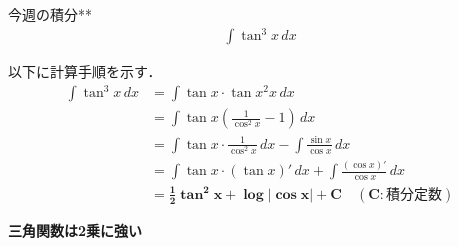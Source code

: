 \documentclass[main]{subfiles}
\begin{document}

\begin{mondai}{1}{今週の積分}{**}
    \begin{align*}
        \int \tan^3 x \, dx
    \end{align*}
\end{mondai}


\solutionhead
\hfill
以下に計算手順を示す．
\hfill\ 
\begin{align*}
    \int \tan ^3 x \, dx   
        &= \int \tan x \cdot \tan x ^2 x \, dx \\
        &= \int \tan x \left( \frac{1}{\cos ^2 x} -1 \right)  \, dx \\
        &= \int \tan x \cdot \frac{1}{\cos ^2 x} \, dx - \int \frac{\sin x}{\cos x} \, dx \\
        &= \int \tan x \cdot \left(\tan x\right)' \, dx + \int \frac{\left(\cos x\right)'}{\cos x} \, dx \\
        &= \boldsymbol{\frac{1}{2} \tan ^2 x + \log \left| \cos x \right| + C \quad (C:\textbf{積分定数})}
\end{align*}

\begin{focusbox}
\centering
\textbf{三角関数は2乗に強い}
\end{focusbox}
\end{document}
